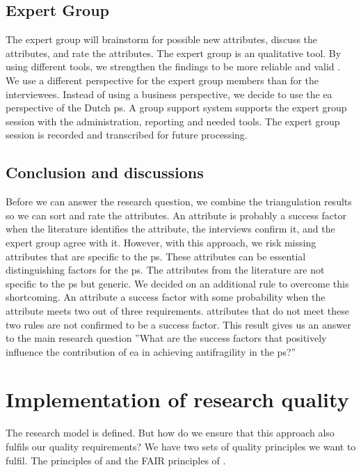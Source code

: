 \subsection{Expert Group}
\label{sub:expertgroup}
The expert group will brainstorm for possible new \glspl{attribute}, discuss the \glspl{attribute}, and rate the \glspl{attribute}. The expert group is an qualitative tool. By using different tools, we strengthen the findings to be more reliable and valid \parencite[p.~91]{Recker2012}. We use a different perspective for the expert group members than for the interviewees. Instead of using a business perspective, we decide to use the \gls{ea} perspective of the Dutch \gls{ps}. A group support system supports the expert group session with the administration, reporting and needed tools. The expert group session is recorded and transcribed for future processing.

\subsection{Conclusion and discussions}
\label{sub:conclusionanddiscussions}
Before we can answer the research question, we combine the \gls{triangulation} results so we can sort and rate the \glspl{attribute}. An \gls{attribute} is probably a success factor when the literature identifies the \gls{attribute}, the interviews confirm it, and the expert group agree with it. However, with this approach, we risk missing \glspl{attribute} that are specific to the \gls{ps}. These \glspl{attribute} can be essential distinguishing factors for the \gls{ps}. The \glspl{attribute} from the literature are not specific to the \gls{ps} but generic. We decided on an additional rule to overcome this shortcoming. An \gls{attribute} a success factor with some probability when the \gls{attribute} meets two out of three requirements. \Glspl{attribute} that do not meet these two rules are not confirmed to be a success factor. This result gives us an answer to the main research question ''What are the success factors that positively influence the contribution of \gls{ea} in achieving \gls{antifragility} in the \gls{ps}?'' 

\section{Implementation of research quality}
\label{sec:researchqualityimplementation}
The research model is defined. But how do we ensure that this approach also fulfils our quality requirements? We have two sets of quality principles we want to fulfil. The principles of \textcite{Recker2012} and the FAIR principles of \textcite{Wilkinson2016}.

